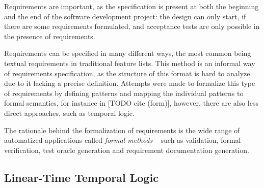 Requirements are important, as the specification is present at both the beginning and the end of the software development project: the design can only start, if there are some requirements formulated, and acceptance tests are only possible in the presence of requirements.

Requirements can be specified in many different ways, the most common being textual requirements in traditional feature lists. This method is an informal way of requirements specification, as the structure of this format is hard to analyze due to it lacking a precise definition. Attempts were made to formalize this type of requirements by defining patterns and mapping the individual patterns to formal semantics, for instance in [TODO cite (form)], however, there are also less direct approaches, such as temporal logic. 

The rationale behind the formalization of requirements is the wide range of automatized applications called \textit{formal methods} -- such as validation, formal verification, test oracle generation and requirement documentation generation.

\subsection{Linear-Time Temporal Logic} \label{subs_backgrltl}

